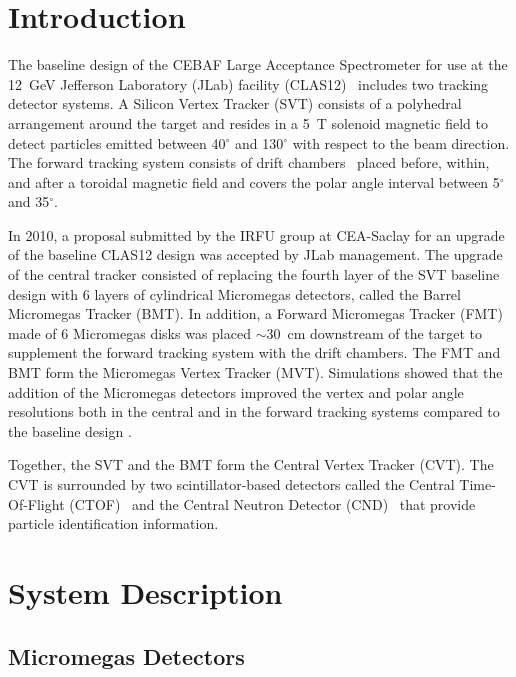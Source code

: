 \section{Introduction}

The baseline design of the CEBAF Large Acceptance Spectrometer for use at the 12~GeV Jefferson Laboratory
(JLab) facility (CLAS12)~\cite{clas12-nim} includes two tracking detector systems. A Silicon Vertex Tracker (SVT)
\cite{svt-nim} consists of a polyhedral arrangement around the target and resides in a 5~T solenoid magnetic field to
detect particles emitted between 40$^\circ$ and 130$^\circ$ with respect to the beam direction. The forward tracking
system consists of drift chambers~\cite{dc-nim} placed before, within, and after a toroidal magnetic field and covers
the polar angle interval between 5$^\circ$ and 35$^\circ$. 

In 2010, a proposal submitted by the IRFU group at CEA-Saclay for an upgrade of the baseline CLAS12 design was
accepted by JLab management. The upgrade of the central tracker consisted of replacing the fourth layer of the SVT
baseline design with 6 layers of cylindrical Micromegas detectors, called the Barrel Micromegas Tracker (BMT). In
addition, a Forward Micromegas Tracker (FMT) made of 6 Micromegas disks was placed $\sim$30~cm downstream of
the target to supplement the forward tracking system with the drift chambers. The FMT and BMT form the Micromegas
Vertex Tracker (MVT). Simulations showed that the addition of the Micromegas detectors improved the vertex and polar
angle resolutions both in the central and in the forward tracking systems compared to the baseline design
\cite{CLAS-NOTE2007-004,CLAS-NOTE2010-003}.

Together, the SVT and the BMT form the Central Vertex Tracker (CVT). The CVT is surrounded by two scintillator-based
detectors called the Central Time-Of-Flight (CTOF)~\cite{ctof-nim} and the Central Neutron Detector (CND)~\cite{cnd-nim}
that provide particle identification information.

\section{System Description}

\subsection{Micromegas Detectors}


